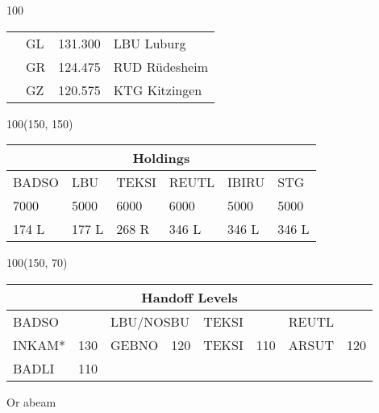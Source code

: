 \documentclass[10pt,landscape,a4paper]{article}
\begin{document}
\begin{textblock}{100}
\begin{table}[]
\begin{tabular}{llcl}
\multicolumn{1}{|l|}{}                     & \multicolumn{1}{l|}{GL}          & \multicolumn{1}{c|}{131.300}          & \multicolumn{1}{l|}{LBU Luburg}             \\
\multicolumn{1}{|l|}{}                     & \multicolumn{1}{l|}{GR}          & \multicolumn{1}{c|}{124.475}          & \multicolumn{1}{l|}{RUD Rüdesheim}          \\
\multicolumn{1}{|l|}{}                     & \multicolumn{1}{l|}{GZ}          & \multicolumn{1}{c|}{120.575}          & \multicolumn{1}{l|}{KTG Kitzingen}          \\ \hline
\end{tabular}
\end{table}
\end{textblock}

\begin{textblock}{100}(150, 150)
\begin{table}[]
\begin{tabular}{llllll}
\multicolumn{6}{c}{\textbf{Holdings}}                                                                                                                                        \\ \hline
\multicolumn{1}{|l|}{BADSO} & \multicolumn{1}{l|}{LBU}   & \multicolumn{1}{l|}{TEKSI} & \multicolumn{1}{l|}{REUTL} & \multicolumn{1}{l|}{IBIRU} & \multicolumn{1}{l|}{STG}   \\ \hline
\multicolumn{1}{|l|}{7000}  & \multicolumn{1}{l|}{5000}  & \multicolumn{1}{l|}{6000}  & \multicolumn{1}{l|}{6000}  & \multicolumn{1}{l|}{5000}  & \multicolumn{1}{l|}{5000}  \\
\multicolumn{1}{|l|}{174 L} & \multicolumn{1}{l|}{177 L} & \multicolumn{1}{l|}{268 R} & \multicolumn{1}{l|}{346 L} & \multicolumn{1}{l|}{346 L} & \multicolumn{1}{l|}{346 L} \\ \hline
\end{tabular}
\end{table}
\end{textblock}


\begin{textblock}{100}(150, 70)
\begin{table}[]
\begin{tabular}{llllllll}
\multicolumn{8}{c}{\textbf{Handoff Levels}}                                                                                                                     \\ \hline
\multicolumn{2}{|l|}{BADSO}                            & \multicolumn{2}{l|}{LBU/NOSBU}   & \multicolumn{2}{l|}{TEKSI}       & \multicolumn{2}{l|}{REUTL}       \\ \hline
\multicolumn{1}{|l}{INKAM*}  & \multicolumn{1}{l|}{130} & GEBNO & \multicolumn{1}{l|}{120} & TEKSI & \multicolumn{1}{l|}{110} & ARSUT & \multicolumn{1}{l|}{120} \\
\multicolumn{1}{|l}{BADLI} & \multicolumn{1}{l|}{110} & \multicolumn{2}{l|}{}            & \multicolumn{2}{l|}{}            & \multicolumn{2}{l|}{}            \\ \hline
\end{tabular}
\end{table}
\scriptsize * Or abeam
\end{textblock}
\end{document}
